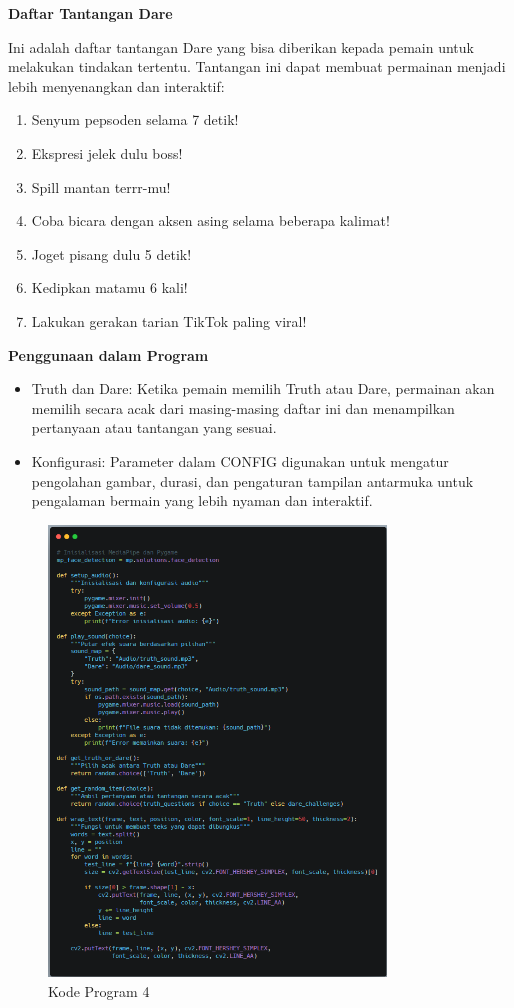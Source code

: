 \documentclass[11pt,a4paper]{article}
\begin{document}
\textbf{Daftar Tantangan Dare}

Ini adalah daftar tantangan Dare yang bisa diberikan kepada pemain untuk melakukan tindakan tertentu. Tantangan ini dapat membuat permainan menjadi lebih menyenangkan dan interaktif:
\begin{enumerate}
    \item Senyum pepsoden selama 7 detik!
    \item Ekspresi jelek dulu boss!
    \item Spill mantan terrr-mu!
    \item Coba bicara dengan aksen asing selama beberapa kalimat!
    \item Joget pisang dulu 5 detik!
    \item Kedipkan matamu 6 kali!
    \item Lakukan gerakan tarian TikTok paling viral!
\end{enumerate}

\newpage
\textbf{Penggunaan dalam Program}
\begin{itemize}
    \item Truth dan Dare: Ketika pemain memilih Truth atau Dare, permainan akan memilih secara acak dari masing-masing daftar ini dan menampilkan pertanyaan atau tantangan yang sesuai.
    \item Konfigurasi: Parameter dalam CONFIG digunakan untuk mengatur pengolahan gambar, durasi, dan pengaturan tampilan antarmuka untuk pengalaman bermain yang lebih nyaman dan interaktif.
\end{itemize}

\begin{figure}[H]
    \centering
    \includegraphics[width=0.8\textwidth]{4.png} %
    \caption{Kode Program 4}
    \label{fig:4}
\end{figure}
\end{document}
